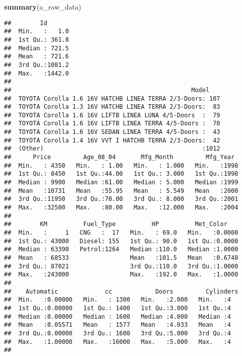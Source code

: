 \documentclass[]{article}
\newenvironment{Shaded}{\begin{snugshade}}{\end{snugshade}}
\newcommand{\KeywordTok}[1]{\textcolor[rgb]{0.13,0.29,0.53}{\textbf{#1}}}
\newcommand{\NormalTok}[1]{#1}
\begin{document}
\begin{Shaded}
\begin{Highlighting}[]
\KeywordTok{summary}\NormalTok{(a_raw_data)}
\end{Highlighting}
\end{Shaded}

\begin{verbatim}
##        Id        
##  Min.   :   1.0  
##  1st Qu.: 361.8  
##  Median : 721.5  
##  Mean   : 721.6  
##  3rd Qu.:1081.2  
##  Max.   :1442.0  
##                  
##                                                  Model     
##  TOYOTA Corolla 1.6 16V HATCHB LINEA TERRA 2/3-Doors: 107  
##  TOYOTA Corolla 1.3 16V HATCHB LINEA TERRA 2/3-Doors:  83  
##  TOYOTA Corolla 1.6 16V LIFTB LINEA LUNA 4/5-Doors  :  79  
##  TOYOTA Corolla 1.6 16V LIFTB LINEA TERRA 4/5-Doors :  70  
##  TOYOTA Corolla 1.6 16V SEDAN LINEA TERRA 4/5-Doors :  43  
##  TOYOTA Corolla 1.4 16V VVT I HATCHB TERRA 2/3-Doors:  42  
##  (Other)                                            :1012  
##      Price         Age_08_04       Mfg_Month         Mfg_Year   
##  Min.   : 4350   Min.   : 1.00   Min.   : 1.000   Min.   :1998  
##  1st Qu.: 8450   1st Qu.:44.00   1st Qu.: 3.000   1st Qu.:1998  
##  Median : 9900   Median :61.00   Median : 5.000   Median :1999  
##  Mean   :10731   Mean   :55.95   Mean   : 5.549   Mean   :2000  
##  3rd Qu.:11950   3rd Qu.:70.00   3rd Qu.: 8.000   3rd Qu.:2001  
##  Max.   :32500   Max.   :80.00   Max.   :12.000   Max.   :2004  
##                                                                 
##        KM          Fuel_Type          HP          Met_Color     
##  Min.   :     1   CNG   :  17   Min.   : 69.0   Min.   :0.0000  
##  1st Qu.: 43000   Diesel: 155   1st Qu.: 90.0   1st Qu.:0.0000  
##  Median : 63390   Petrol:1264   Median :110.0   Median :1.0000  
##  Mean   : 68533                 Mean   :101.5   Mean   :0.6748  
##  3rd Qu.: 87021                 3rd Qu.:110.0   3rd Qu.:1.0000  
##  Max.   :243000                 Max.   :192.0   Max.   :1.0000  
##                                                                 
##    Automatic             cc            Doors         Cylinders
##  Min.   :0.00000   Min.   : 1300   Min.   :2.000   Min.   :4  
##  1st Qu.:0.00000   1st Qu.: 1400   1st Qu.:3.000   1st Qu.:4  
##  Median :0.00000   Median : 1600   Median :4.000   Median :4  
##  Mean   :0.05571   Mean   : 1577   Mean   :4.033   Mean   :4  
##  3rd Qu.:0.00000   3rd Qu.: 1600   3rd Qu.:5.000   3rd Qu.:4  
##  Max.   :1.00000   Max.   :16000   Max.   :5.000   Max.   :4  
##                                                               

\end{verbatim}
\end{document}
